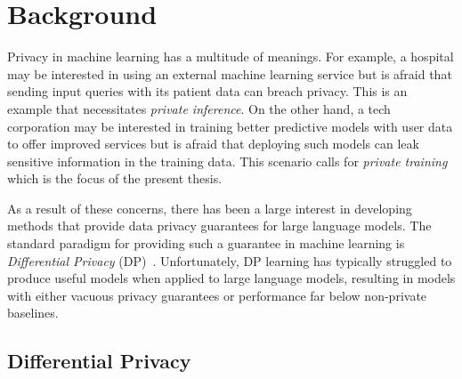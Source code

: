 \chapter{Background}\label{ch_2}

Privacy in machine learning has a multitude of meanings.
For example, a hospital may be interested in using an external machine learning service but is afraid that sending input queries with its patient data can breach privacy.
This is an example that necessitates \emph{private inference}.
On the other hand, a tech corporation may be interested in training better predictive models with user data to offer improved services but is afraid that deploying such models can leak sensitive information in the training data.
This scenario calls for \emph{private training} which is the focus of the present thesis. 


As a result of these concerns, there has been a large interest in developing
methods that provide data privacy guarantees for large language models.
The standard paradigm for providing such a guarantee in machine learning is \textit{Differential Privacy} (DP)~\citep{dwork2006calibrating,dwork2014algorithmic}.
Unfortunately, DP learning has typically struggled to produce useful models when applied to large language models, resulting in models with either vacuous privacy guarantees \citep{dupuy2021efficient} or performance far below non-private baselines.


\section{Differential Privacy}

